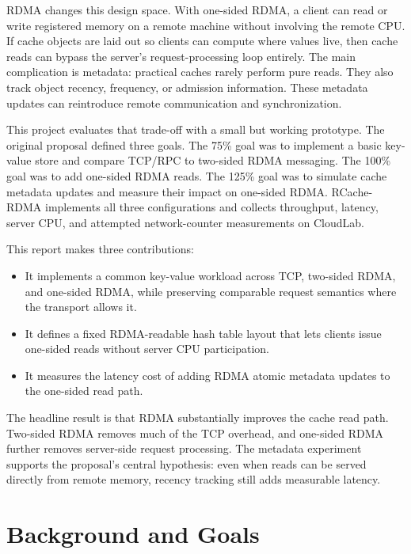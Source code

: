 \documentclass[letterpaper,twocolumn,10pt]{article}
\newcommand{\sys}{RCache-RDMA}
\begin{document}
RDMA changes this design space.  With one-sided RDMA, a client can read or
write registered memory on a remote machine without involving the remote CPU.
If cache objects are laid out so clients can compute where values live, then
cache reads can bypass the server's request-processing loop entirely.  The
main complication is metadata: practical caches rarely perform pure reads.
They also track object recency, frequency, or admission information.  These
metadata updates can reintroduce remote communication and synchronization.

This project evaluates that trade-off with a small but working prototype.
The original proposal defined three goals.  The 75\% goal was to implement a
basic key-value store and compare TCP/RPC to two-sided RDMA messaging.  The
100\% goal was to add one-sided RDMA reads.  The 125\% goal was to simulate
cache metadata updates and measure their impact on one-sided RDMA.  \sys{}
implements all three configurations and collects throughput, latency, server
CPU, and attempted network-counter measurements on CloudLab.

This report makes three contributions:
\begin{itemize}[leftmargin=*,noitemsep]
\item It implements a common key-value workload across TCP, two-sided RDMA,
and one-sided RDMA, while preserving comparable request semantics where the
transport allows it.
\item It defines a fixed RDMA-readable hash table layout that lets clients
issue one-sided reads without server CPU participation.
\item It measures the latency cost of adding RDMA atomic metadata updates to
the one-sided read path.
\end{itemize}

The headline result is that RDMA substantially improves the cache read path.
Two-sided RDMA removes much of the TCP overhead, and one-sided RDMA further
removes server-side request processing.  The metadata experiment supports the
proposal's central hypothesis: even when reads can be served directly from
remote memory, recency tracking still adds measurable latency.

\section{Background and Goals}
\end{document}

